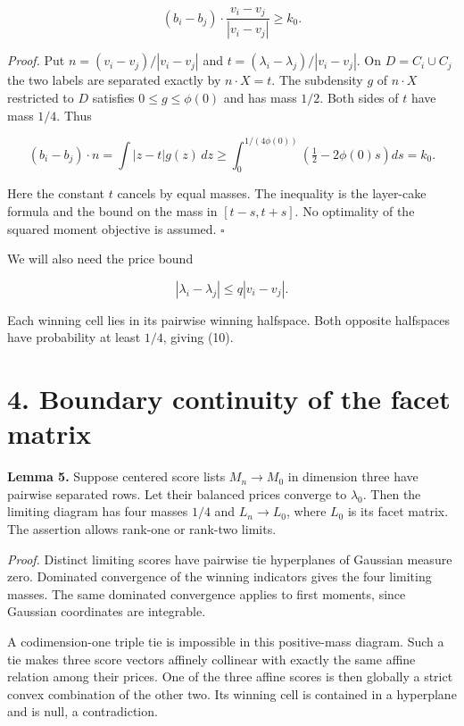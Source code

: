 \documentclass[
  11pt,
]{article}
\begin{document}
\[
 (b_i-b_j)\cdot\frac{v_i-v_j}{|v_i-v_j|}\ge k_0.        \tag{8}
\]

\emph{Proof.} Put \(n=(v_i-v_j)/|v_i-v_j|\) and
\(t=(\lambda_i-\lambda_j)/|v_i-v_j|\). On \(D=C_i\cup C_j\) the two
labels are separated exactly by \(n\cdot X=t\). The subdensity \(g\) of
\(n\cdot X\) restricted to \(D\) satisfies \(0\le g\le\phi(0)\) and has
mass \(1/2\). Both sides of \(t\) have mass \(1/4\). Thus

\[
 (b_i-b_j)\cdot n=\int|z-t|g(z)\,dz
 \ge\int_0^{1/(4\phi(0))}\left(\tfrac12-2\phi(0)s\right)ds
 =k_0.                                                \tag{9}
\]

Here the constant \(t\) cancels by equal masses. The inequality is the
layer-cake formula and the bound on the mass in \([t-s,t+s]\). No
optimality of the squared moment objective is assumed. \(\square\)

We will also need the price bound

\[
 |\lambda_i-\lambda_j|\le q|v_i-v_j|.                  \tag{10}
\]

Each winning cell lies in its pairwise winning halfspace. Both opposite
halfspaces have probability at least \(1/4\), giving (10).

\section{4. Boundary continuity of the facet
matrix}\label{boundary-continuity-of-the-facet-matrix}

\textbf{Lemma 5.} Suppose centered score lists \(M_n\to M_0\) in
dimension three have pairwise separated rows. Let their balanced prices
converge to \(\lambda_0\). Then the limiting diagram has four masses
\(1/4\) and \(L_n\to L_0\), where \(L_0\) is its facet matrix. The
assertion allows rank-one or rank-two limits.

\emph{Proof.} Distinct limiting scores have pairwise tie hyperplanes of
Gaussian measure zero. Dominated convergence of the winning indicators
gives the four limiting masses. The same dominated convergence applies
to first moments, since Gaussian coordinates are integrable.

A codimension-one triple tie is impossible in this positive-mass
diagram. Such a tie makes three score vectors affinely collinear with
exactly the same affine relation among their prices. One of the three
affine scores is then globally a strict convex combination of the other
two. Its winning cell is contained in a hyperplane and is null, a
contradiction.
\end{document}
